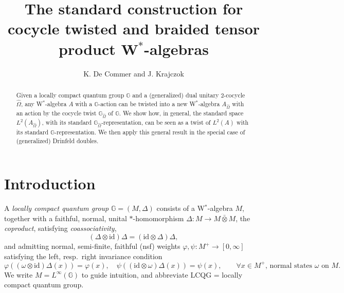 \documentclass[reqno]{amsart}
\title{The standard construction for cocycle twisted and braided tensor product W$^*$-algebras}
\author{K. De Commer and J. Krajczok}
\numberwithin{equation}{section}
\newcommand{\id}{\mathrm{id}}
\newcommand{\G}{\mathbb{G}}
\newcommand{\vp}{\varphi}
\begin{document}
\begin{abstract}
Given a locally compact quantum group $\G$ and a (generalized) dual unitary $2$-cocycle $\hat{\Omega}$, any W$^*$-algebra $A$ with a $\G$-action can be twisted into a new W$^*$-algebra $A_{\hat{\Omega}}$ with an action by the cocycle twist $\G_{\hat{\Omega}}$ of $\G$. We show how, in general, the standard space $L^2(A_{\hat{\Omega}})$, with its standard $\G_{\hat{\Omega}}$-representation, can be seen as a twist  of $L^2(A)$ with its standard $\G$-representation. We then apply this general result in the special case of (generalized) Drinfeld doubles.
\end{abstract}

\maketitle

\section*{Introduction}

A \emph{locally compact quantum group} $\G = (M,\Delta)$  \cites{KV00,KV03} consists of a W$^*$-algebra $M$, together with a faithful, normal, unital $*$-homomorphism $\Delta\colon M \rightarrow M\bar{\otimes} M$, the \emph{coproduct}, satisfying \emph{coassociativity},
\begin{equation}\label{EqCoasso}
(\Delta\otimes \id)\Delta = (\id\otimes \Delta)\Delta,
\end{equation}
and admitting normal, semi-finite, faithful (nsf) weights $\varphi,\psi\colon M^+ \rightarrow [0,\infty]$ satisfying the left, resp.\ right invariance condition
\[
\vp((\omega\otimes \id)\Delta(x)) = \vp(x),\quad \psi((\id\otimes \omega)\Delta(x)) = \psi(x),\qquad \forall x \in M^+,\, \textrm{normal states }\omega\textrm{ on }M.
\]
We write $M = L^{\infty}(\G)$ to guide intuition, and abbreviate LCQG = locally compact quantum group. 
\end{document}
